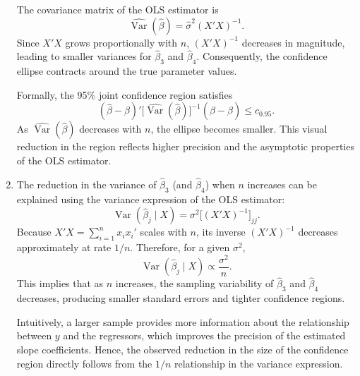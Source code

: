 \begin{enumerate}[label=(\roman*)]
\medskip
\noindent
The covariance matrix of the OLS estimator is
\[
\widehat{\operatorname{Var}}(\hat{\beta}) = \hat{\sigma}^2 (X'X)^{-1}.
\]
Since $X'X$ grows proportionally with $n$, $(X'X)^{-1}$ decreases in magnitude, 
leading to smaller variances for $\hat{\beta}_3$ and $\hat{\beta}_4$.  
Consequently, the confidence ellipse contracts around the true parameter values.

\medskip
\noindent
Formally, the 95\% joint confidence region satisfies
\[
(\hat{\beta} - \beta)' 
\big[\widehat{\operatorname{Var}}(\hat{\beta})\big]^{-1} 
(\hat{\beta} - \beta) \leq c_{0.95}.
\]
As $\widehat{\operatorname{Var}}(\hat{\beta})$ decreases with $n$, 
the ellipse becomes smaller.  
This visual reduction in the region reflects higher precision and the asymptotic properties of the OLS estimator.

\item

The reduction in the variance of $\hat{\beta}_3$ (and $\hat{\beta}_4$) when $n$ increases 
can be explained using the variance expression of the OLS estimator:
\[
\operatorname{Var}(\hat{\beta}_j \mid X) = \sigma^2 \big[(X'X)^{-1}\big]_{jj}.
\]
Because $X'X = \sum_{i=1}^n x_i x_i'$ scales with $n$, 
its inverse $(X'X)^{-1}$ decreases approximately at rate $1/n$.  
Therefore, for a given $\sigma^2$,
\[
\operatorname{Var}(\hat{\beta}_j \mid X) \propto \frac{\sigma^2}{n}.
\]
This implies that as $n$ increases, the sampling variability of $\hat{\beta}_3$ and $\hat{\beta}_4$ decreases, 
producing smaller standard errors and tighter confidence regions.

\medskip
\noindent
Intuitively, a larger sample provides more information about the relationship between $y$ and the regressors, 
which improves the precision of the estimated slope coefficients.  
Hence, the observed reduction in the size of the confidence region directly follows from the 
$1/n$ relationship in the variance expression.



\end{enumerate}